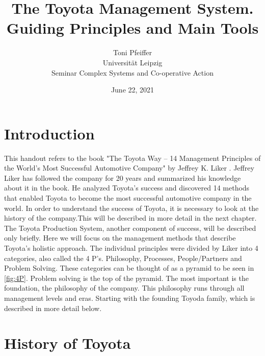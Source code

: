 \documentclass[11pt,a4paper]{article}
\title{The Toyota Management System. \\ Guiding Principles and Main Tools}
\author{Toni Pfeiffer\\
  Universität Leipzig\\
  Seminar Complex Systems and Co-operative Action
}
\date{June 22, 2021}
\begin{document}
\maketitle

\section{Introduction}
This handout refers to the book "The Toyota Way -- 14 Management Principles of
the World's Most Successful Automotive Company" by Jeffrey K. Liker
\cite{toyota_book}.  Jeffrey Liker has followed the company for 20 years and
summarized his knowledge about it in the book. He analyzed Toyota's success
and discovered 14 methods that enabled Toyota to become the most successful
automotive company in the world. In order to understand the success of Toyota,
it is necessary to look at the history of the company.This will be described
in more detail in the next chapter. The Toyota Production System, another
component of success, will be described only briefly.  Here we will focus on
the management methods that describe Toyota's holistic approach. The
individual principles were divided by Liker into 4 categories, also called the
4 P's. Philosophy, Processes, People/Partners and Problem Solving. These
categories can be thought of as a pyramid to be seen in \autoref{fig:4P}.
Problem solving is the top of the pyramid. The most important is the
foundation, the philosophy of the company. This philosophy runs through all
management levels and eras. Starting with the founding Toyoda family, which is
described in more detail below.

\section{History of Toyota}
\end{document}
